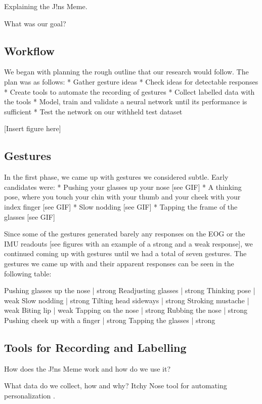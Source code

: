 \documentclass[runningheads]{llncs}
\begin{document}
Explaining the J!ns Meme.

What was our goal?

\subsection{Workflow}
We began with planning the rough outline that our research would follow.
The plan was as follows:
* Gather gesture ideas
* Check ideas for detectable responses
* Create tools to automate the recording of gestures
* Collect labelled data with the tools
* Model, train and validate a neural network until its performance is sufficient
* Test the network on our withheld test dataset

[Insert figure here]

\subsection{Gestures}
In the first phase, we came up with gestures we considered subtle. Early candidates were:
* Pushing your glasses up your nose [see GIF]
* A thinking pose, where you touch your chin with your thumb and your cheek with your
index finger [see GIF]
* Slow nodding [see GIF]
* Tapping the frame of the glasses [see GIF]

Since some of the gestures generated barely any responses on the EOG or the IMU readouts
[see figures with an example of a strong and a weak response],
we continued coming up with gestures until we had a total of seven gestures.
The gestures we came up with and their apparent responses can be seen in the following
table:

Pushing glasses up the nose | strong
Readjusting glasses | strong
Thinking pose | weak
Slow nodding | strong
Tilting head sideways | strong
Stroking mustache | weak
Biting lip | weak
Tapping on the nose | strong
Rubbing the nose | strong
Pushing cheek up with a finger | strong
Tapping the glasses | strong

\subsection{Tools for Recording and Labelling}
How does the J!ns Meme work and how do we use it?

What data do we collect, how and why?
Itchy Nose tool for automating personalization \cite{10.1145/3174910.3174953}.
\end{document}
